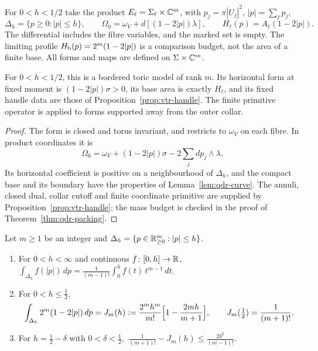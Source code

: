 \begin{definition}\label{def:qdr-model}
For $0<h<1/2$ take the product $E_\ell=\Sigma_\ell\times\mathbb{C}^m$, with $p_j=\pi|U_j|^2$, $|p|=\sum_jp_j$,
\[
 \Delta_h=\{p\ge0:|p|\le h\},\qquad
 \Omega_0=\omega_V+d[(1-2|p|)\lambda],\qquad
 H_\ell(p)=A_\ell(1-2|p|).
\]
The differential includes the fibre variables, and the marked set is empty. The limiting profile $H_{\mathrm b}(p)=2^m(1-2|p|)$ is a
comparison budget, not the area of a finite base. All forms and maps are defined on $\Sigma\times\mathbb{C}^m$.
\end{definition}

\begin{lemma}\label{lem:qdr-is-model}
For $0<h<1/2$, this is a bordered toric model of rank $m$. Its horizontal form at fixed moment is $(1-2|p|)\sigma>0$, its base area
is exactly $H_\ell$, and its fixed handle data are those of Proposition~\ref{prop:vtr-handle}. The finite primitive operator is
applied to forms supported away from the outer collar.
\end{lemma}

\begin{proof}
The form is closed and torus invariant, and restricts to $\omega_V$ on each fibre. In product coordinates it is
\[
 \Omega_0=\omega_V+(1-2|p|)\sigma-2\sum_jdp_j\wedge\lambda.
\]
Its horizontal coefficient is positive on a neighbourhood of $\Delta_h$, and the compact base and its boundary have the properties
of Lemma~\ref{lem:qdr-curve}. The annuli, closed dual, collar cutoff and finite coordinate primitive are supplied by
Proposition~\ref{prop:vtr-handle}; the mass budget is checked in the proof of Theorem~\ref{thm:qdr-packing}.
\end{proof}

\begin{lemma}\label{lem:qdr-volume}
Let $m\ge1$ be an integer and $\Delta_h=\{p\in\mathbb{R}^m_{\ge0}:|p|\le h\}$.
\begin{enumerate}[label=(\alph*)]
\item For $0<h<\infty$ and continuous $f\colon[0,h]\to\mathbb{R}$,
$\int_{\Delta_h}f(|p|)\,dp=\frac1{(m-1)!}\int_0^hf(t)\,t^{m-1}\,dt$.
\item For $0<h\le\frac12$,
\[
 \int_{\Delta_h}2^m(1-2|p|)\,dp=J_m(h):=\frac{2^mh^m}{m!}\Bigl[1-\frac{2mh}{m+1}\Bigr],\qquad J_m(\tfrac12)=\frac1{(m+1)!}.
\]
\item For $h=\frac12-\delta$ with $0<\delta<\frac12$, $\ \frac1{(m+1)!}-J_m(h)\le\frac{2\delta^2}{(m-1)!}$.
\end{enumerate}
\end{lemma}

